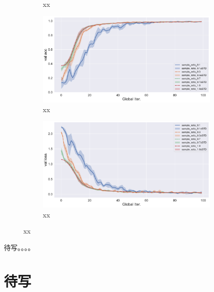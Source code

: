 \begin{figure}[ht]
\begin{subfigure}{.5\textwidth}
  \caption{xx}
  \label{fig:fedsplit-compare-sample-ratio-val-loss}
\end{subfigure}
\begin{subfigure}{.5\textwidth}
  \centering
  \includegraphics[width=.95\linewidth]{figures/ifca-compare-sample-ratio-val-acc.pdf}
  \caption{xx}
  \label{fig:ifca-compare-sample-ratio-val-acc}
\end{subfigure}%
\begin{subfigure}{.5\textwidth}
  \centering
  \includegraphics[width=.95\linewidth]{figures/ifca-compare-sample-ratio-val-loss.pdf}
  \caption{xx}
  \label{fig:ifca-compare-sample-ratio-val-loss}
\end{subfigure}
\caption{xx}
\label{fig:fedprox-compare-sample-ratio}
\end{figure}



待写。。。。

\section{待写}



